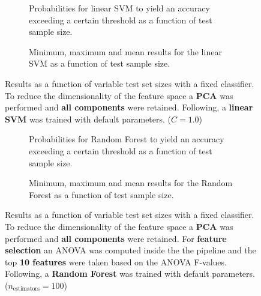 \begin{figure}
    \captionsetup[subfigure]{justification=justified,singlelinecheck=false}
    \begin{subfigure}[t]{0.61\textwidth}
        
        \caption{Probabilities for linear SVM to yield an accuracy exceeding a certain threshold as a function of test sample size.}
    \end{subfigure}
    \hspace{3.0mm}
    \begin{subfigure}[t]{0.34\textwidth}
        
        \caption{Minimum, maximum and mean results for the linear SVM as a function of test sample size.}
    \end{subfigure}
    \caption[Effects of varying test sample size. Linear SVM; Preprocessing: PCA ($n_\text{components} = \text{all}$)]{Results as a function of variable test set sizes with a fixed classifier. To reduce the dimensionality of the feature space a \textbf{PCA} was performed and \textbf{all components} were retained. Following, a \textbf{{linear SVM}} was trained with default parameters. ($C=\num{1.0}$)}
    \label{fig:PCA_all_components_no_selection_LinearSVC}
\end{figure}

\begin{figure}
    \captionsetup[subfigure]{justification=justified,singlelinecheck=false}
    \begin{subfigure}[t]{0.61\textwidth}
        
        \caption{Probabilities for Random Forest to yield an accuracy exceeding a certain threshold as a function of test sample size.}
    \end{subfigure}
    \hspace{3.0mm}
    \begin{subfigure}[t]{0.34\textwidth}
        
        \caption{Minimum, maximum and mean results for the Random Forest as a function of test sample size.}
    \end{subfigure}
    \caption[Effects of varying test sample size. Random Forest; Preprocessing: PCA ($n_\text{components} = \text{all}$); ANOVA feature selection ($k_\text{best} = \num{10}$)]{Results as a function of variable test set sizes with a fixed classifier. To reduce the dimensionality of the feature space a \textbf{PCA} was performed and \textbf{all components} were retained. For \textbf{feature selection} an ANOVA was computed inside the the pipeline and the top \textbf{10 features} were taken based on the ANOVA F-values. Following, a \textbf{{Random Forest}} was trained with default parameters. ($n_\text{estimators}=\num{100}$)}
    \label{fig:PCA_all_components_10_best_selected_RandomForest}
\end{figure}

